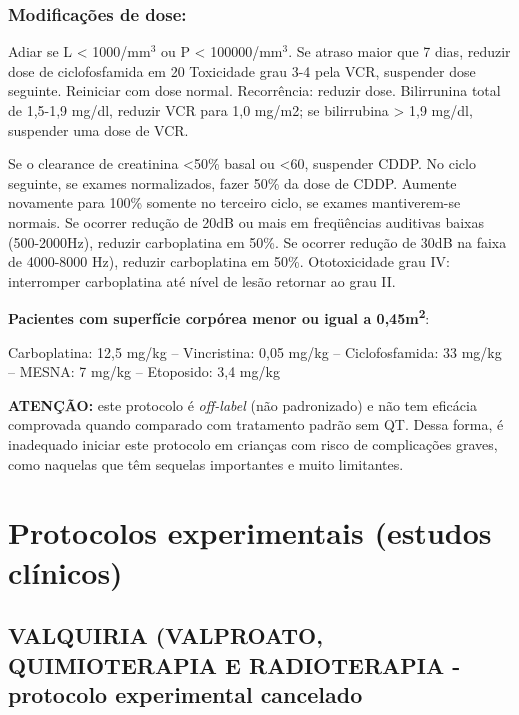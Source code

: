 \documentclass[11pt,a4paper,oldfontcommands]{memoir}
\begin{document}
\subsection{Modificações de dose:}

Adiar se L < 1000/mm\(^3\) ou P < 100000/mm\(^3\). Se atraso maior que 7 dias, reduzir dose de ciclofosfamida em 20%
Toxicidade grau 3-4 pela VCR, suspender dose seguinte. Reiniciar com dose normal. Recorrência: reduzir dose.
Bilirrunina total de 1,5-1,9 mg/dl, reduzir VCR para 1,0 mg/m2; se bilirrubina > 1,9 mg/dl, suspender uma dose de VCR.

Se o clearance de creatinina <50\% basal ou <60, suspender CDDP. No ciclo seguinte, se exames normalizados, fazer 50\% da dose de CDDP. Aumente novamente para 100\% somente no terceiro ciclo, se exames mantiverem-se normais.
Se ocorrer redução de 20dB ou mais em freqüências auditivas baixas (500-2000Hz), reduzir carboplatina em 50\%. Se ocorrer redução de 30dB na faixa de 4000-8000 Hz), reduzir carboplatina em 50\%. Ototoxicidade grau IV: interromper carboplatina até nível de lesão retornar ao grau II.

\textbf{Pacientes com superfície corpórea menor ou igual a 0,45m\textsuperscript{2}}:

Carboplatina: 12,5 mg/kg – Vincristina: 0,05 mg/kg – Ciclofosfamida: 33 mg/kg – MESNA: 7 mg/kg – Etoposido: 3,4 mg/kg

\textbf{ATENÇÃO:} este protocolo é \textit{off-label} (não padronizado) e não tem eficácia comprovada quando comparado com tratamento padrão sem QT. Dessa forma, é inadequado iniciar este protocolo em crianças com risco de complicações graves, como naquelas que têm sequelas importantes e muito limitantes.

\cleardoublepage
\chapter{Protocolos experimentais (estudos clínicos)}
\cleardoublepage

\section{VALQUIRIA (VALPROATO, QUIMIOTERAPIA E RADIOTERAPIA - protocolo experimental cancelado}
{\let\thefootnote\relax{}}
\end{document}
